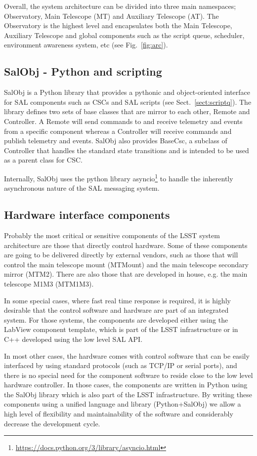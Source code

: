 Overall, the system architecture can be divided into three main namespaces; Observatory, Main Telescope (MT) and Auxiliary Telescope 
(AT). The Observatory is the highest level and encapsulates both the Main Telescope, Auxiliary Telescope and global components such
as the script queue, scheduler, environment awareness system, etc (see Fig.~\ref{fig:arc}).

\subsection{SalObj - Python and scripting }\label{sect:salobj}

SalObj is a Python library that provides a pythonic and object-oriented interface for SAL components such as CSCs and SAL 
scripts (see Sect.~\ref{sect:scriptq}). The library defines two sets of base classes that are mirror to each other, 
Remote and Controller. A Remote will send commands to and receive telemetry and events from a specific component whereas a 
Controller will receive commands and publish telemetry and events. SalObj also provides BaseCsc, a subclass of Controller 
that handles the standard state transitions and is intended to be used as a parent class for CSC.

Internally, SalObj uses the python library asyncio\footnote{\url{https://docs.python.org/3/library/asyncio.html}} to handle the 
inherently asynchronous nature of the SAL messaging system.

\subsection{Hardware interface components}\label{sect:hardware_csc}
Probably the most critical or sensitive components of the LSST system architecture are those that directly control hardware. Some 
of these components are going to be delivered directly by external vendors, such as those that will control the main telescope 
mount (MTMount) and the main telescope secondary mirror (MTM2). There are also those that are developed in house, e.g. the 
main telescope M1M3 (MTM1M3).

In some special cases, where fast real time response is required, it is highly desirable that the control software and hardware are part 
of an integrated system. For those systems, the components are developed either using the LabView component template, which is 
part of the LSST infrastructure or in C++ developed using the low level SAL API.

In most other cases, the hardware comes with control software that can be easily interfaced by using standard protocols (such as 
TCP/IP or serial ports), and there is no special need for the component software to reside close to the low level hardware controller. 
In those cases, the components are written in Python using the SalObj library which is also part of the LSST infrastructure. By 
writing these components using a unified language and library (Python+SalObj) we allow a high level of flexibility and 
maintainability of the software and considerably decrease the development cycle.

